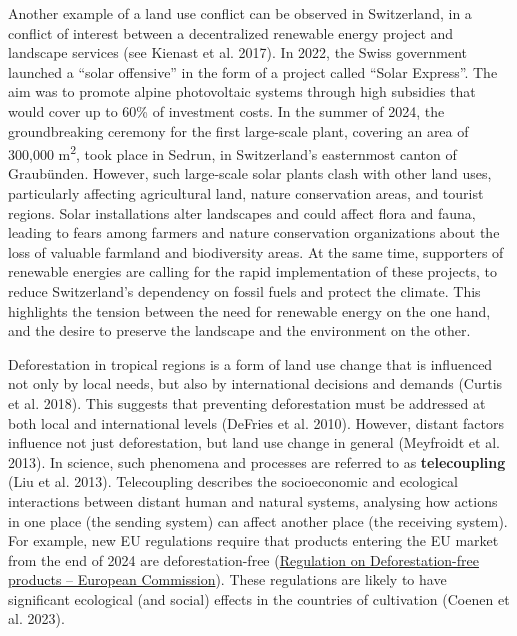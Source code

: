 \documentclass[
  a4paper,
  DIV=11,
  numbers=noendperiod,
  oneside,
  openany]{scrreprt}
\begin{document}
\begin{tcolorbox}[enhanced jigsaw, arc=.35mm, bottomrule=.15mm, bottomtitle=1mm, breakable, colback=white, colbacktitle=quarto-callout-tip-color!10!white, colframe=quarto-callout-tip-color-frame, coltitle=black, left=2mm, leftrule=.75mm, opacityback=0, opacitybacktitle=0.6, rightrule=.15mm, title={Land use conflicts in Switzerland: the Solar Express}, titlerule=0mm, toprule=.15mm, toptitle=1mm]

Another example of a land use conflict can be observed in Switzerland,
in a conflict of interest between a decentralized renewable energy
project and landscape services (see Kienast et al. 2017). In 2022, the
Swiss government launched a ``solar offensive'' in the form of a project
called ``Solar Express''. The aim was to promote alpine photovoltaic
systems through high subsidies that would cover up to 60\% of investment
costs. In the summer of 2024, the groundbreaking ceremony for the first
large-scale plant, covering an area of 300,000 m\textsuperscript{2},
took place in Sedrun, in Switzerland's easternmost canton of Graubünden.
However, such large-scale solar plants clash with other land uses,
particularly affecting agricultural land, nature conservation areas, and
tourist regions. Solar installations alter landscapes and could affect
flora and fauna, leading to fears among farmers and nature conservation
organizations about the loss of valuable farmland and biodiversity
areas. At the same time, supporters of renewable energies are calling
for the rapid implementation of these projects, to reduce Switzerland's
dependency on fossil fuels and protect the climate. This highlights the
tension between the need for renewable energy on the one hand, and the
desire to preserve the landscape and the environment on the other.

\end{tcolorbox}

Deforestation in tropical regions is a form of land use change that is
influenced not only by local needs, but also by international decisions
and demands (Curtis et al. 2018). This suggests that preventing
deforestation must be addressed at both local and international levels
(DeFries et al. 2010). However, distant factors influence not just
deforestation, but land use change in general (Meyfroidt et al. 2013).
In science, such phenomena and processes are referred to as
\textbf{telecoupling} ({Liu et al.} 2013). Telecoupling describes the
socioeconomic and ecological interactions between distant human and
natural systems, analysing how actions in one place (the sending system)
can affect another place (the receiving system). For example, new EU
regulations require that products entering the EU market from the end of
2024 are deforestation-free
(\href{https://environment.ec.europa.eu/topics/forests/deforestation/regulation-deforestation-free-products_en}{Regulation
on Deforestation-free products -- European Commission}). These
regulations are likely to have significant ecological (and social)
effects in the countries of cultivation (Coenen et al. 2023).
\end{document}
